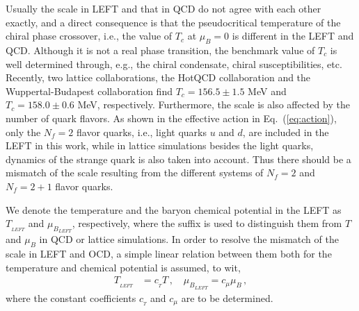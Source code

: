 \documentclass[%
reprint,
superscriptaddress,
showpacs,preprintnumbers,
 amsmath,amssymb,
 aps,
prd,
]{revtex4-1}
\def\Eq#1{Eq.~(\ref{#1})}
\begin{document}
Usually the scale in LEFT and that in QCD do not agree with each other exactly, and a direct consequence is that the pseudocritical temperature of the chiral phase crossover, i.e., the value of $T_c$ at $\mu_B=0$ is different in the LEFT and QCD. Although it is not a real phase transition, the benchmark value of $T_c$ is well determined through, e.g., the chiral condensate, chiral susceptibilities, etc. Recently, two lattice collaborations, the HotQCD collaboration and the Wuppertal-Budapest collaboration find $T_c=156.5\pm 1.5$ MeV \cite{Bazavov:2018mes} and $T_c=158.0\pm 0.6$ MeV, respectively. Furthermore, the scale is also affected by the number of quark flavors. As shown in the effective action in \Eq{eq:action}, only the $N_f=2$ flavor quarks, i.e., light quarks $u$ and $d$, are included in the LEFT in this work, while in lattice simulations besides the light quarks, dynamics of the strange quark is also taken into account. Thus there should be a mismatch of the scale resulting from the different systems of $N_f=2$ and $N_f=2+1$ flavor quarks.

We denote the temperature and the baryon chemical potential in the LEFT as $T_{_{LEFT}}$ and $\mu_{B_{LEFT}}$, respectively, where the suffix is used to distinguish them from $T$ and $\mu_{B}$ in QCD or lattice simulations. In order to resolve the mismatch of the scale in LEFT and OCD, a simple linear relation between them both for the temperature and chemical potential is assumed, to wit,
%
\begin{align}
  T_{_{LEFT}}&=c_{_{T}}T\,, \quad \mu_{B_{LEFT}}=c_{\mu}\mu_{B}\,,\label{eq:rescale}
\end{align}
%
where the constant coefficients $c_{_{T}}$ and $c_{\mu}$ are to be determined.
\end{document}
